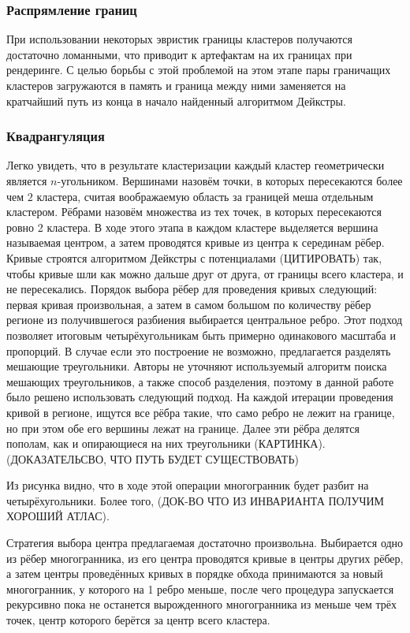 \documentclass[12pt]{extarticle}
\begin{document}
\subsubsection{Распрямление границ}
При использовании некоторых эвристик границы кластеров получаются достаточно ломанными, что приводит к артефактам на их границах при рендеринге. С целью борьбы с этой проблемой на этом этапе пары граничащих кластеров загружаются в память и граница между ними заменяется на кратчайший путь из конца в начало найденный алгоритмом Дейкстры.

\subsubsection{Квадрангуляция}
Легко увидеть, что в результате кластеризации каждый кластер геометрически является $n$-угольником. Вершинами назовём точки, в которых пересекаются более чем $2$ кластера, считая воображаемую область за границей меша отдельным кластером. Рёбрами назовём множества из тех точек, в которых пересекаются ровно 2 кластера. В ходе этого этапа в каждом кластере выделяется вершина называемая центром, а затем проводятся кривые из центра к серединам рёбер. Кривые строятся алгоритмом Дейкстры с потенциалами (ЦИТИРОВАТЬ) так, чтобы кривые шли как можно дальше друг от друга, от границы всего кластера, и не пересекались. Порядок выбора рёбер для проведения кривых следующий: первая кривая произвольная, а затем в самом большом по количеству рёбер регионе из получившегося разбиения выбирается центральное ребро. Этот подход позволяет итоговым четырёхугольникам быть примерно одинакового масштаба и пропорций. В случае если это построение не возможно, предлагается разделять мешающие треугольники. Авторы не уточняют используемый алгоритм поиска мешающих треугольников, а также способ разделения, поэтому в данной работе было решено использовать следующий подход. На каждой итерации проведения кривой в регионе, ищутся все рёбра такие, что само ребро не лежит на границе, но при этом обе его вершины лежат на границе. Далее эти рёбра делятся пополам, как и опирающиеся на них треугольники (КАРТИНКА).
(ДОКАЗАТЕЛЬСВО, ЧТО ПУТЬ БУДЕТ СУЩЕСТВОВАТЬ)

Из рисунка видно, что в ходе этой операции многогранник будет разбит на четырёхугольники. Более того, (ДОК-ВО ЧТО ИЗ ИНВАРИАНТА ПОЛУЧИМ ХОРОШИЙ АТЛАС).

Стратегия выбора центра предлагаемая \cite{purnomo2004} достаточно произвольна. Выбирается одно из рёбер многогранника, из его центра проводятся кривые в центры других рёбер, а затем центры проведённых кривых в порядке обхода принимаются за новый многогранник, у которого на 1 ребро меньше, после чего процедура запускается рекурсивно пока не останется вырожденного многогранника из меньше чем трёх точек, центр которого берётся за центр всего кластера.
\end{document}
